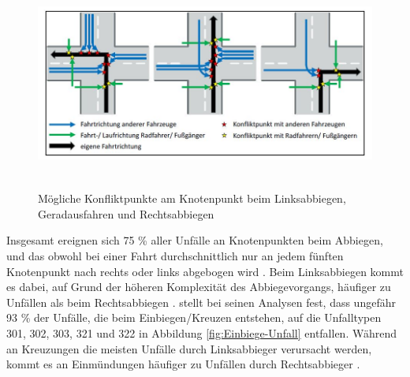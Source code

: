 \begin{savenotes}
	\begin{figure}[H]
		\centering
		\includegraphics[width=15cm,height=7cm]{figures/Konfliktpunkte}
		\caption[Mögliche Konfliktpunkte am Knotenpunkt beim Linksabbiegen, Geradausfahren und Rechtsabbiegen]{Mögliche Konfliktpunkte am Knotenpunkt beim Linksabbiegen, Geradausfahren und Rechtsabbiegen \parencite[S. 41]{Gerstenberger.17.02.2015}}\label{fig:Konfliktpunke am Knotenpunkt}
	\end{figure}
\end{savenotes}

Insgesamt ereignen sich 75 \% aller Unfälle an Knotenpunkten beim Abbiegen, und das obwohl bei einer Fahrt durchschnittlich nur an jedem fünften Knotenpunkt nach rechts oder links abgebogen wird \parencite[S. 101f]{Gerstenberger.17.02.2015}. Beim Linksabbiegen kommt es dabei, auf Grund der höheren Komplexität des Abbiegevorgangs, häufiger zu Unfällen als beim Rechtsabbiegen \parencite[S. 117]{Grundl.2005}. \Textcite[S. 15]{Mages.2008} stellt bei seinen Analysen fest, dass ungefähr 93 \% der Unfälle, die beim Einbiegen/Kreuzen entstehen, auf die Unfalltypen 301, 302, 303, 321 und 322 in Abbildung \ref{fig:Einbiege-Unfall} entfallen. Während an Kreuzungen die meisten Unfälle durch Linksabbieger verursacht werden, kommt es an Einmündungen häufiger zu Unfällen durch Rechtsabbieger \parencite[S. 102-103] {Gerstenberger.17.02.2015}.

